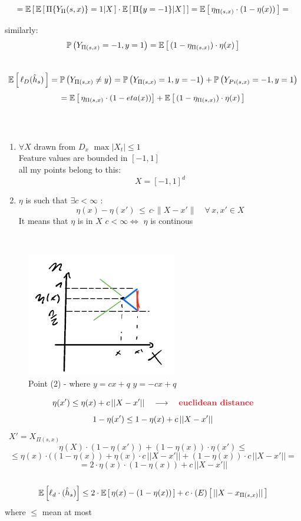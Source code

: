 \documentclass[../main.tex]{subfiles}
\begin{document}
$$ = \mathbb{E}\left[ \, \mathbb{E}\left[ \, \Pi \{Y_\Pi(s,x)\} = 1 | X \, \right] \cdot \mathbb{E}\left[\, \Pi \{y = -1\} |X \, \right]\, \right] = \mathbb{E}\left[\, \eta_{\Pi(s,x)} \cdot (1-\eta(x))\, \right] =
$$

similarly:
$$
\mathbb{P}\left(Y_{\Pi(s,x)} = -1 ,  y = 1 \right) = \mathbb{E} \left[\, (1- \eta_{\Pi(s,x)}) \cdot \eta(x) \, \right]
$$\
$$
\mathbb{E} \left[\,  \ell_D (\hat{h}_s) \, \right] = \mathbb{P}\left(Y_{\Pi(s,x)} \neq y \right) = \mathbb{P}\left(Y_{\Pi(s,x)} = 1, y = -1\right) + \mathbb{P}\left(Y_{Pi(s,x)} = -1, y = 1\right) 
$$
$$
= \mathbb{E} \left[\, \eta_{\Pi(s,x)} \cdot (1-eta(x))\right] + \mathbb{E}\left[\,( 1- \eta_{\Pi(s,x)})\cdot \eta(x)\, \right]
$$
\\
\\
\begin{enumerate}
\item $\forall X$ drawn from $D_x$ \quad $\max |X_t| \leq 1$\\
Feature values are bounded in $[-1,1]$\\
all my points belong to this:$$
X = \left[-1,1\right]^d
$$
\item $\eta$ is such that $\exists c < \infty$ :\\
$$
\eta(x) - \eta(x') \, \leq \, c \cdot \| X-x' \| \quad \forall \, x,x' \in X
$$
It means that $\eta$ is  in $X$ 
$c <\infty \Leftrightarrow$ $\eta$ is continous\\
\end{enumerate}
\\
\begin{figure}[h]
    \centering
    \includegraphics[width=0.6\linewidth]{../img/lez10-img1.JPG}
    \caption{Point (2) - where \quad $y = cx +q$ \qquad  $y = -cx +q $}
\end{figure}
$$
\eta(x') \leq \eta(x) + c \, || X-x'|| \quad \longrightarrow \quad  \bred{euclidean distance}
$$
$$
1-\eta(x') \leq 1- \eta(x) + c \, ||X-x'||
\\\\
$$\
$
X' = X_{\Pi(s,x)}
$
$$
\eta(X) \cdot \left(1-\eta(x')\right) + \left(1-\eta(x)\right)\cdot \eta(x') \leq
$$
$$
\leq \eta(x) \cdot((1-\eta(x))+\eta(x)\cdot c \, ||X-x'|| + (1-\eta(x))\cdot c \, ||X-x'|| = 
$$
$$
= 2 \cdot \eta(x) \cdot (1- \eta(x)) + c\, ||X-x'|| 
$$\
$$
\mathbb{E}\left[\ell_d \cdot (\hat{h}_s)\right] \leq 
2 \cdot \mathbb{E} \left[\, \eta(x) - (1-\eta(x))\, \right] + c \cdot \mathbb{(}E)\left[\, ||X-x_{\Pi(s,x)}||\, \right]
$$
where $\leq$ mean at most
\\\\
\end{document}
